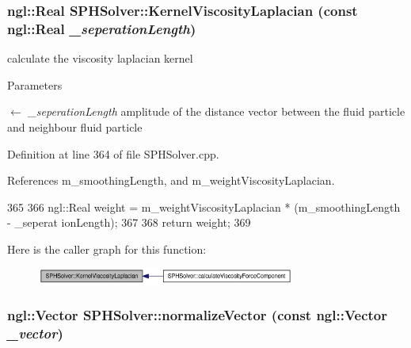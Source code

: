 \hypertarget{class_s_p_h_solver_a3e4f7c09c45d3f49fa38f813d55e724b}{
\subsubsection[{KernelViscosityLaplacian}]{\setlength{\rightskip}{0pt plus 5cm}ngl::Real SPHSolver::KernelViscosityLaplacian (const ngl::Real {\em \_\-seperationLength})}}
\label{class_s_p_h_solver_a3e4f7c09c45d3f49fa38f813d55e724b}


calculate the viscosity laplacian kernel 


\begin{DoxyParams}{Parameters}
\item[\mbox{$\leftarrow$} {\em \_\-seperationLength}]amplitude of the distance vector between the fluid particle and neighbour fluid particle \end{DoxyParams}


Definition at line 364 of file SPHSolver.cpp.



References m\_\-smoothingLength, and m\_\-weightViscosityLaplacian.




\begin{DoxyCode}
365 {
366     ngl::Real weight = m_weightViscosityLaplacian * (m_smoothingLength - _seperat
      ionLength);
367 
368     return weight;
369 }
\end{DoxyCode}




Here is the caller graph for this function:\nopagebreak
\begin{figure}[H]
\begin{center}
\leavevmode
\includegraphics[width=240pt]{class_s_p_h_solver_a3e4f7c09c45d3f49fa38f813d55e724b_icgraph}
\end{center}
\end{figure}


\hypertarget{class_s_p_h_solver_a22ef88cb68a8f4befa6f281e10cf65a6}{
\subsubsection[{normalizeVector}]{\setlength{\rightskip}{0pt plus 5cm}ngl::Vector SPHSolver::normalizeVector (const ngl::Vector {\em \_\-vector})}}
\label{class_s_p_h_solver_a22ef88cb68a8f4befa6f281e10cf65a6}


